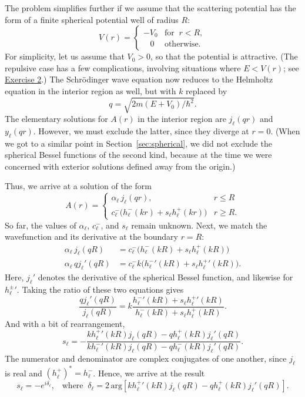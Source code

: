 \documentclass[pra,12pt]{revtex4}
\begin{document}
The problem simplifies further if we assume that the scattering
potential has the form of a finite spherical potential well of radius
$R$:
$$V(r) = \begin{cases}-V_0 &\mathrm{for}\;\; r < R, \\ \;\;\; 0 & \mathrm{otherwise}.\end{cases}$$
For simplicity, let us assume that $V_0 > 0$, so that the potential is
attractive.  (The repulsive case has a few complications, involving
situations where $E < V(r)$; see
\hyperref[ex:spherical_barrier]{Exercise 2}.)  The Schr\"odinger wave
equation now reduces to the Helmholtz equation in the interior
region as well, but with $k$ replaced by
$$q = \sqrt{2m(E+V_0)/\hbar^2}.$$
The elementary solutions for $A(r)$ in the interior region are
$j_\ell(qr)$ and $y_\ell(qr)$.  However, we must exclude the latter,
since they diverge at $r = 0$.  (When we got to a similar point in
Section~\ref{sec:spherical}, we did not exclude the spherical Bessel
functions of the second kind, because at the time we were concerned
with exterior solutions defined away from the origin.)

Thus, we arrive at a solution of the form
$$A(r) = \begin{cases} \alpha_\ell\, j_\ell(qr), & r \le R \\ c^-_\ell \Big(h^-_\ell(kr) + s_\ell h^+_\ell(kr)\Big) & r \ge R.\end{cases}$$
So far, the values of $\alpha_\ell$, $c^-_\ell$, and $s_\ell$ remain
unknown.  Next, we match the wavefunction and its
derivative at the boundary $r = R$:
$$\begin{aligned} \alpha_\ell\, j_\ell(qR) &= c^-_\ell \Big(h^-_\ell(kR) + s_\ell h^+_\ell(kR)\Big) \\ \alpha_\ell\, q j_\ell'(qR) &= c^-_\ell k \Big({h^-_\ell}'(kR) + s_\ell {h^+_\ell}'(kR)\Big).\end{aligned}$$
Here, $j_\ell'$ denotes the derivative of the spherical Bessel
function, and likewise for ${h_\ell^\pm}'$.  Taking the ratio of these
two equations gives
$$\frac{q j_\ell'(qR)}{j_\ell(qR)} = k \frac{{h^-_\ell}'(kR) + s_\ell {h^+_\ell}'(kR)}{h^-_\ell(kR) + s_\ell h^+_\ell(kR)}.$$
And with a bit of rearrangement,
$$s_\ell = - \frac{k{h_\ell^+}'(kR) j_\ell(qR) - qh_\ell^+(kR)j_\ell'(qR)}{k{h_\ell^-}'(kR) j_\ell(qR) - qh_\ell^-(kR)j_\ell'(qR)}.$$
The numerator and denominator are complex conjugates of one another,
since $j_\ell$ is real and $(h_\ell^+)^* = h_\ell^-$.  Hence, we
arrive at the result
$$s_\ell = - e^{i\delta_\ell}, \;\;\;\mathrm{where}\;\; \delta_\ell = 2\,\mathrm{arg}\!\left[k{h_\ell^+}'(kR) j_\ell(qR) - qh_\ell^+(kR)j_\ell'(qR)\right].$$
\end{document}
